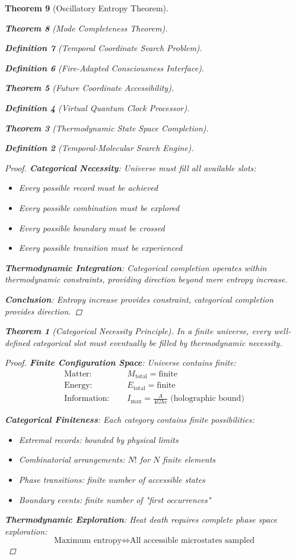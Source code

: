 \documentclass[12pt,a4paper]{article}
\newtheorem{theorem}{Theorem}[section]
\newtheorem{definition}[theorem]{Definition}
\begin{document}
\begin{theorem}[Oscillatory Entropy Theorem]
\begin{theorem}[Mode Completeness Theorem]
\begin{enumerate}
\begin{definition}[Temporal Coordinate Search Problem]
\begin{algorithm}
\begin{definition}[Fire-Adapted Consciousness Interface]
\begin{theorem}[Future Coordinate Accessibility]
\begin{definition}[Virtual Quantum Clock Processor]
\begin{itemize}
\begin{itemize}
\begin{theorem}[Thermodynamic State Space Completion]
\begin{definition}[Temporal-Molecular Search Engine]
\begin{proof}
\textbf{Categorical Necessity}: Universe must fill all available slots:
\begin{itemize}
    \item Every possible record must be achieved
    \item Every possible combination must be explored
    \item Every possible boundary must be crossed
    \item Every possible transition must be experienced
\end{itemize}

\textbf{Thermodynamic Integration}: Categorical completion operates within thermodynamic constraints, providing direction beyond mere entropy increase.

\textbf{Conclusion}: Entropy increase provides constraint, categorical completion provides direction.
\end{proof}

\begin{theorem}[Categorical Necessity Principle]
In a finite universe, every well-defined categorical slot must eventually be filled by thermodynamic necessity.
\end{theorem}

\begin{proof}
\textbf{Finite Configuration Space}: Universe contains finite:
\begin{align}
\text{Matter: } &\quad M_{\text{total}} = \text{finite} \\
\text{Energy: } &\quad E_{\text{total}} = \text{finite} \\
\text{Information: } &\quad I_{\max} = \frac{A}{4G\hbar c} \text{ (holographic bound)}
\end{align}

\textbf{Categorical Finiteness}: Each category contains finite possibilities:
\begin{itemize}
    \item Extremal records: bounded by physical limits
    \item Combinatorial arrangements: $N!$ for $N$ finite elements
    \item Phase transitions: finite number of accessible states
    \item Boundary events: finite number of "first occurrences"
\end{itemize}

\textbf{Thermodynamic Exploration}: Heat death requires complete phase space exploration:
$$\text{Maximum entropy} \Leftrightarrow \text{All accessible microstates sampled}$$


\end{proof}
\end{definition}
\end{theorem}
\end{itemize}
\end{itemize}
\end{definition}
\end{theorem}
\end{definition}
\end{algorithm}
\end{definition}
\end{enumerate}
\end{theorem}
\end{theorem}
\end{document}
